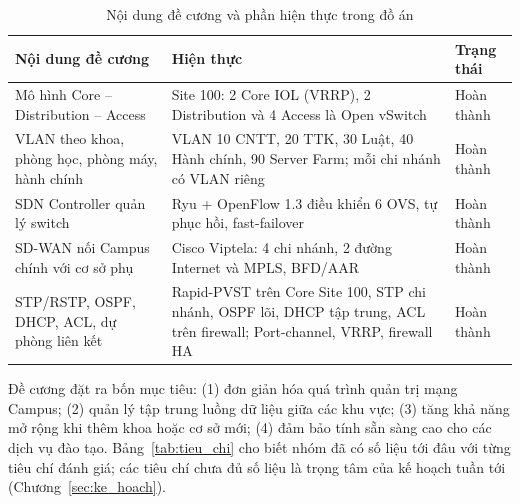 \begin{table}[H]
    \centering
    \small
    \caption{Nội dung đề cương và phần hiện thực trong đồ án}
    \label{tab:de_cuong}
    \begin{tabularx}{\textwidth}{|P{4.4cm}|X|P{2.0cm}|}
        \hline
        \textbf{Nội dung đề cương} & \textbf{Hiện thực} & \textbf{Trạng thái} \\
        \hline
        Mô hình Core -- Distribution -- Access & Site 100: 2 Core IOL (VRRP), 2 Distribution và 4 Access là Open vSwitch & Hoàn thành \\
        \hline
        VLAN theo khoa, phòng học, phòng máy, hành chính & VLAN 10 CNTT, 20 TTK, 30 Luật, 40 Hành chính, 90 Server Farm; mỗi chi nhánh có VLAN riêng & Hoàn thành \\
        \hline
        SDN Controller quản lý switch & Ryu + OpenFlow 1.3 điều khiển 6 OVS, tự phục hồi, fast-failover & Hoàn thành \\
        \hline
        SD-WAN nối Campus chính với cơ sở phụ & Cisco Viptela: 4 chi nhánh, 2 đường Internet và MPLS, BFD/AAR & Hoàn thành \\
        \hline
        STP/RSTP, OSPF, DHCP, ACL, dự phòng liên kết & Rapid-PVST trên Core Site 100, STP chi nhánh, OSPF lõi, DHCP tập trung, ACL trên firewall; Port-channel, VRRP, firewall HA & Hoàn thành \\
        \hline
    \end{tabularx}
\end{table}

Đề cương đặt ra bốn mục tiêu: (1) đơn giản hóa quá trình quản trị mạng Campus; (2) quản lý tập trung luồng dữ liệu giữa các khu vực; (3) tăng khả năng mở rộng khi thêm khoa hoặc cơ sở mới; (4) đảm bảo tính sẵn sàng cao cho các dịch vụ đào tạo. Bảng~\ref{tab:tieu_chi} cho biết nhóm đã có số liệu tới đâu với từng tiêu chí đánh giá; các tiêu chí chưa đủ số liệu là trọng tâm của kế hoạch tuần tới (Chương~\ref{sec:ke_hoach}).

